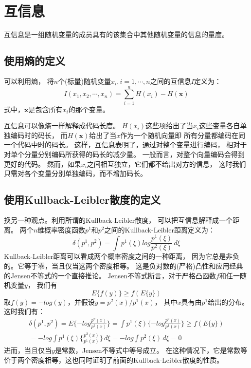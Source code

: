 \section{互信息}
互信息是一组随机变量的成员具有的该集合中其他随机变量的信息的量度。

\subsection{使用熵的定义}
可以利用熵，
将$n$个(标量)随机变量$x_i, i=1,\cdots,n$之间的互信息$I$定义为：
\begin{equation} \label{mutual_info_defination1}
I(x_1, x_2,\cdots ,x_n)=\sum^n_{i=1} H(x_i)-H(\bm{x})
\end{equation}
式中，$\bm{x}$是包含所有$x_i$的那个变量。

互信息可以像熵一样解释成代码长度。
$H(x_i)$这些项给出了当$x_i$这些变量各自单独编码时的码长，
而$H(\bm{x})$给出了当$x$作为一个随机向量即
所有分量都编码在同一个代码中时的码长。
这样，互信息表明了，通过对整个变量进行编码，
相对于对单个分量分别编码所获得的码长的减少量。
一般而言，对整个向量编码会得到更好的代码。
然而，如果$x_i$之间相互独立，它们都不给出对方的信息，
这时我们只需对各个变量分别单独编码，而不增加码长。

\subsection{使用Kullback-Leibler散度的定义}
换另一种观点。利用所谓的Kullback-Leibler散度，
可以把互信息解释成一个距离。
两个$n$维概率密度函数$p^1$和$p^2$之间的Kullback-Leibler距离定义为：
\begin{equation}
\delta(p^1, p^2) = \int p^1(\xi) log \frac{p^1(\xi)}{p^2(\xi)}\,d\xi
\end{equation}
Kullback-Leibler距离可以看成两个概率密度之间的一种距离，
因为它总是非负的。它等于零，当且仅当这两个密度相等。
这是负对数的(严格)凸性和应用经典的Jensen不等式的一个直接推论。
Jensen不等式断言，对于严格凸函数$f$和任一随机变量$y$，
我们有
\begin{equation}
E\{f(y)\} \ge f(E\{y\})
\end{equation}
取$f(y)=-log(y)$，并假设$y=p^2(x)/p^1(x)$，
其中$x$具有由$p^1$给出的分布。这时我们有：
\begin{multline}
\delta(p^1, p^2) = E\{-log \frac{p^2(x)}{p^1(x)} \} 
	= \int p^1(\xi)\{-log \frac{p^2(x)}{p^1(x)} \} 
    \ge f(E\{y\}) \\ 
    = -log \int p^1(\xi)\{ \frac{p^2(x)}{p^1(x)}\}\,d\xi
    = -log \int p^2(\xi)\,d\xi = 0
\end{multline}
进而，当且仅当$y$是常数，Jensen不等式中等号成立。
在这种情况下，它是常数等价于两个密度相等，这也同时证明了前面的Kullback-Leibler散度的性质。

